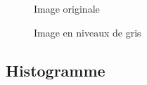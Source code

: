 \documentclass[french,a4paper,10pt]{article}
\begin{document}
    \begin{figure}[!htb]
        \begin{minipage}{0.48\textwidth}
            \centering
            \caption{Image originale}\label{Fig:orig-08}
        \end{minipage}\hfill
        \begin{minipage}{0.48\textwidth}
            \centering
            \caption{Image en niveaux de gris}\label{Fig:resize-08}
        \end{minipage}
    \end{figure}

    \subsection{Histogramme}\label{subsec:1.2}
\end{document}
